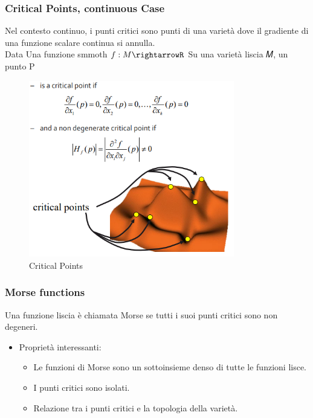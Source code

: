 \subsubsection{Critical Points, continuous Case}
Nel contesto continuo, i punti critici sono punti di una varietà dove il gradiente di una funzione scalare continua si annulla.\\
Data Una funzione smmoth $f:M \rightarrowR$ Su una varietà liscia 𝑀, un punto P
\begin{figure}[H]
    \centering
    \includegraphics[width=0.8\textwidth]{images/CriticalPoints.png} 
    \caption{Critical Points}
    \label{fig:immagine}
\end{figure}
\subsubsection{Morse functions}
Una funzione liscia è chiamata Morse se tutti i suoi punti critici sono non degeneri.
\begin{itemize}
    \item Proprietà interessanti:
    \begin{itemize}
        \item Le funzioni di Morse sono un sottoinsieme denso di tutte le funzioni lisce.
        \item I punti critici sono isolati.
        \item Relazione tra i punti critici e la topologia della varietà.
    \end{itemize}
\end{itemize}
